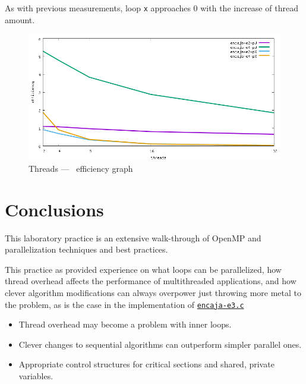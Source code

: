 \documentclass[a4paper]{article}
\newcommand{\github}{https://github.com/kauron/etsinf3/tree/master/CPA/lab2}
\newcommand{\gitline}[2]{\texttt{\href{\github /src/#1#2}{#1}}}
\begin{document}
As with previous measurements, loop \texttt{x} approaches 0 with the increase of thread amount.

\begin{figure}[h]
    \centering
    \includegraphics[width=\textwidth]{../img/efficiency}
    \caption{Threads --- \unskip \, efficiency graph}
    \label{fig:graph-efficiency}
\end{figure}
\newpage

\section{Conclusions}
This laboratory practice is an extensive walk-through of OpenMP and parallelization techniques and best practices.

This practice as provided experience on what loops can be parallelized, how thread overhead affects the performance of multithreaded applications, and how clever algorithm modifications can always overpower just throwing more metal to the problem, as is the case in the implementation of \gitline{encaja-e3.c}.
\begin{itemize}
    \item Thread overhead may become a problem with inner loops.
    \item Clever changes to sequential algorithms can outperform simpler parallel ones.
    \item Appropriate control structures for critical sections and shared, private variables.
\end{itemize}
\end{document}
